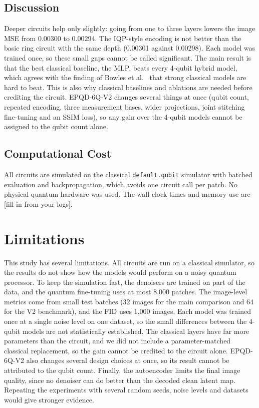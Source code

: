 \documentclass[runningheads]{llncs}
\begin{document}
\subsection{Discussion}
Deeper circuits help only slightly: going from one to three layers lowers the image MSE from 0.00300 to 0.00294. The IQP-style encoding is not better than the basic ring circuit with the same depth (0.00301 against 0.00298). Each model was trained once, so these small gaps cannot be called significant. The main result is that the best classical baseline, the MLP, beats every 4-qubit hybrid model, which agrees with the finding of Bowles et al.~\cite{bowles} that strong classical models are hard to beat. This is also why classical baselines and ablations are needed before crediting the circuit. EPQD-6Q-V2 changes several things at once (qubit count, repeated encoding, three measurement bases, wider projections, joint stitching fine-tuning and an SSIM loss), so any gain over the 4-qubit models cannot be assigned to the qubit count alone.

\subsection{Computational Cost}
All circuits are simulated on the classical \texttt{default.qubit} simulator with batched evaluation and backpropagation, which avoids one circuit call per patch. No physical quantum hardware was used. The wall-clock times and memory use are [fill in from your logs].

\section{Limitations}\label{sec:limitations}
This study has several limitations. All circuits are run on a classical simulator, so the results do not show how the models would perform on a noisy quantum processor. To keep the simulation fast, the denoisers are trained on part of the data, and the quantum fine-tuning uses at most 8{,}000 patches. The image-level metrics come from small test batches (32 images for the main comparison and 64 for the V2 benchmark), and the FID uses 1{,}000 images. Each model was trained once at a single noise level on one dataset, so the small differences between the 4-qubit models are not statistically established. The classical layers have far more parameters than the circuit, and we did not include a parameter-matched classical replacement, so the gain cannot be credited to the circuit alone. EPQD-6Q-V2 also changes several design choices at once, so its result cannot be attributed to the qubit count. Finally, the autoencoder limits the final image quality, since no denoiser can do better than the decoded clean latent map. Repeating the experiments with several random seeds, noise levels and datasets would give stronger evidence.
\end{document}
